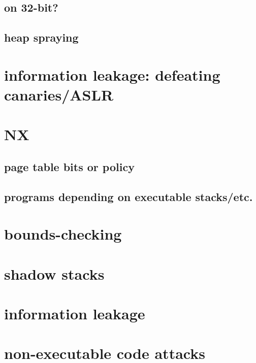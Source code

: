 \subsection{on 32-bit?}

\subsection{heap spraying}

\section{information leakage: defeating canaries/ASLR}

\section{NX}

\subsection{page table bits or policy}

\subsection{programs depending on executable stacks/etc.}

\section{bounds-checking}

\section{shadow stacks}

\section{information leakage}

\section{non-executable code attacks}
